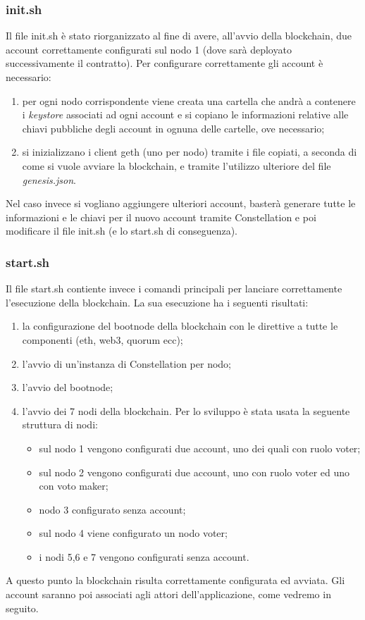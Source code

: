 \subsubsection{init.sh}
Il file init.sh è stato riorganizzato al fine di avere, all'avvio della blockchain, due account correttamente configurati sul nodo 1 (dove sarà deployato successivamente il contratto). Per configurare correttamente gli account è necessario:
\begin{enumerate}
	\item per ogni nodo corrispondente viene creata una cartella che andrà a contenere i \emph{keystore} associati ad ogni account e si copiano le informazioni relative alle chiavi pubbliche degli account in ognuna delle cartelle, ove necessario;
	\item si inizializzano i client geth (uno per nodo) tramite i file copiati, a seconda di come si vuole avviare la blockchain, e tramite l'utilizzo ulteriore del file \emph{genesis.json}.
\end{enumerate}
Nel caso invece si vogliano aggiungere ulteriori account, basterà generare tutte le informazioni e le chiavi per il nuovo account tramite Constellation e poi modificare il file init.sh (e lo start.sh di conseguenza).
\subsubsection{start.sh}
Il file start.sh contiente invece i comandi principali per lanciare correttamente l'esecuzione della blockchain. La sua esecuzione ha i seguenti risultati:
\begin{enumerate}
	\item la configurazione del bootnode della blockchain con le direttive a tutte le componenti (eth, web3, quorum ecc);
	\item l'avvio di un'instanza di Constellation per nodo;
	\item l'avvio del bootnode;
	\item l'avvio dei 7 nodi della blockchain. Per lo sviluppo è stata usata la seguente struttura di nodi:
	      \begin{itemize}
	      	\item sul nodo 1 vengono configurati due account, uno dei quali con ruolo voter;
	      	\item sul nodo 2 vengono configurati due account, uno con ruolo voter ed uno con voto maker;
	      	\item nodo 3 configurato senza account;
	      	\item sul nodo 4 viene configurato un nodo voter;
	      	\item i nodi 5,6 e 7 vengono configurati senza account.
	      \end{itemize}
\end{enumerate}
A questo punto la blockchain risulta correttamente configurata ed avviata. Gli account saranno poi associati agli attori dell'applicazione, come vedremo in seguito.
%

